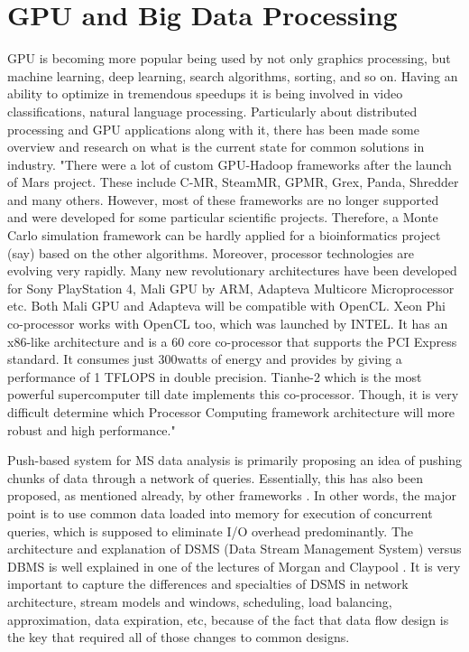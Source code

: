 \documentclass[12pt,letterpaper]{report}
\begin{document}
\section{GPU and Big Data Processing}
\hspace{3em} GPU is becoming more popular being used by not only graphics processing, but machine learning, deep learning, search algorithms, sorting, and so on. Having an ability to optimize in tremendous speedups it is being involved in video classifications, natural language processing. Particularly about distributed processing and GPU applications along with it, there has been made some overview and research on what is the current state for common solutions in industry. "There were a lot of custom GPU-Hadoop frameworks after the launch of Mars project. These include C-MR, SteamMR, GPMR, Grex, Panda, Shredder and many others. However, most of these frameworks are no longer supported and were developed for some particular scientific projects. Therefore, a Monte Carlo simulation framework can be hardly applied for a bioinformatics project (say) based on the other algorithms. Moreover, processor technologies are evolving very rapidly. Many new revolutionary architectures have been developed for Sony PlayStation 4, Mali GPU by ARM, Adapteva Multicore Microprocessor etc. Both Mali GPU and Adapteva will be compatible with OpenCL. Xeon Phi co-processor works with OpenCL too, which was launched by INTEL. It has an x86-like architecture and is a 60 core co-processor that supports the PCI Express standard. It consumes just 300watts of energy and provides by giving a performance of 1 TFLOPS in double precision. Tianhe-2 which is the most powerful supercomputer till date implements this co-processor. Though, it is very difficult determine which Processor Computing framework architecture will more robust and high
performance." \cite{hadoopgpu}

Push-based system for MS data analysis is primarily proposing an idea of pushing chunks of data through a network of queries. Essentially, this has also been proposed, as mentioned already, by other frameworks \cite{DataPath,Volcano,Qpipe}. In other words, the major point is to use common data loaded into memory for execution of concurrent queries, which is supposed to eliminate I/O overhead predominantly. The architecture and explanation of DSMS (Data Stream Management System) versus DBMS is well explained in one of the lectures of Morgan and Claypool \cite{DataStreamManagement}. It is very important to capture the differences and specialties of DSMS in network architecture, stream models and windows, scheduling, load balancing, approximation, data expiration, etc, because of the fact that data flow design is the key that required all of those changes to common designs.
\end{document}
